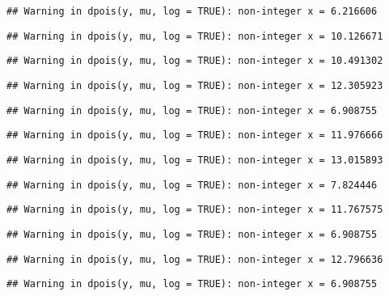\documentclass[
]{article}
\begin{document}
\begin{verbatim}
## Warning in dpois(y, mu, log = TRUE): non-integer x = 6.216606
\end{verbatim}

\begin{verbatim}
## Warning in dpois(y, mu, log = TRUE): non-integer x = 10.126671
\end{verbatim}

\begin{verbatim}
## Warning in dpois(y, mu, log = TRUE): non-integer x = 10.491302
\end{verbatim}

\begin{verbatim}
## Warning in dpois(y, mu, log = TRUE): non-integer x = 12.305923
\end{verbatim}

\begin{verbatim}
## Warning in dpois(y, mu, log = TRUE): non-integer x = 6.908755
\end{verbatim}

\begin{verbatim}
## Warning in dpois(y, mu, log = TRUE): non-integer x = 11.976666
\end{verbatim}

\begin{verbatim}
## Warning in dpois(y, mu, log = TRUE): non-integer x = 13.015893
\end{verbatim}

\begin{verbatim}
## Warning in dpois(y, mu, log = TRUE): non-integer x = 7.824446
\end{verbatim}

\begin{verbatim}
## Warning in dpois(y, mu, log = TRUE): non-integer x = 11.767575
\end{verbatim}

\begin{verbatim}
## Warning in dpois(y, mu, log = TRUE): non-integer x = 6.908755
\end{verbatim}

\begin{verbatim}
## Warning in dpois(y, mu, log = TRUE): non-integer x = 12.796636
\end{verbatim}

\begin{verbatim}
## Warning in dpois(y, mu, log = TRUE): non-integer x = 6.908755
\end{verbatim}
\end{document}
